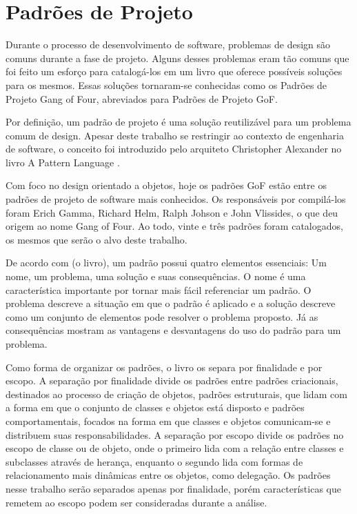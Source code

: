 \chapter{Padrões de Projeto}

Durante o processo de desenvolvimento de software, 
problemas de design são comuns durante a 
fase de projeto. Alguns desses problemas 
eram tão comuns que foi feito um esforço para catalogá-los 
em um livro \cite{gamma:1995} que oferece possíveis soluções para os mesmos. 
Essas soluções tornaram-se conhecidas como 
os Padrões de Projeto Gang of Four, abreviados 
para Padrões de Projeto GoF.

Por definição, um padrão de projeto é uma solução 
reutilizável para um problema comum de design. Apesar 
deste trabalho se restringir ao contexto de engenharia 
de software, o conceito foi introduzido pelo arquiteto 
Christopher Alexander no livro A Pattern Language 
\cite{alexanderpatternlanguage}.

Com foco no design orientado a objetos, hoje os 
padrões GoF estão entre os padrões de 
projeto de software mais conhecidos. Os responsáveis 
por compilá-los foram Erich Gamma, Richard Helm, 
Ralph Johson e John Vlissides, o que deu origem ao 
nome Gang of Four. Ao todo, vinte e três 
padrões foram catalogados, os mesmos que serão o alvo 
deste trabalho.

De acordo com (o livro), um padrão possui quatro elementos 
essenciais: Um nome, um problema, uma solução e suas 
consequências. O nome é uma característica importante 
por tornar mais fácil referenciar um padrão. O problema 
descreve a situação em que o padrão é aplicado e 
a solução descreve como um conjunto de elementos pode 
resolver o problema proposto. Já as consequências 
mostram as vantagens e desvantagens do uso do padrão 
para um problema.

Como forma de organizar os padrões, o livro os separa 
por finalidade e por escopo. A separação por finalidade 
divide os padrões entre padrões criacionais, 
destinados ao processo de criação de objetos, padrões 
estruturais, que lidam com a forma em que o conjunto de 
classes e objetos está disposto e padrões comportamentais, 
focados na forma em que classes e objetos comunicam-se 
e distribuem suas responsabilidades. A separação por 
escopo divide os padrões no escopo de classe ou de objeto, 
onde o primeiro lida com a relação entre classes e 
subclasses através de herança, enquanto o segundo lida 
com formas de relacionamento mais dinâmicas entre os 
objetos, como delegação. Os padrões nesse trabalho 
serão separados apenas por finalidade, porém 
características que remetem ao escopo 
podem ser consideradas durante a análise.

